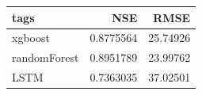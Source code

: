 
\begin{tabular}[t]{l|r|r}
\hline
tags & NSE & RMSE\\
\hline
xgboost & 0.8775564 & 25.74926\\
\hline
randomForest & 0.8951789 & 23.99762\\
\hline
LSTM & 0.7363035 & 37.02501\\
\hline
\end{tabular}

